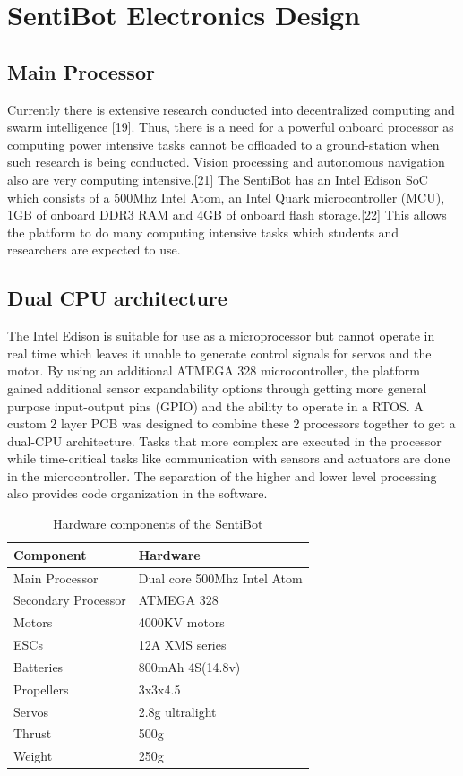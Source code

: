 \documentclass[12pt]{article}
\begin{document}
\section{SentiBot Electronics Design}

\subsection{Main Processor}

Currently there is extensive research conducted into decentralized computing and swarm intelligence [19].  Thus, there is a need for a powerful onboard processor as computing power intensive tasks cannot be offloaded to a ground-station when such research is being conducted. Vision processing and autonomous navigation also are very computing intensive.[21] The SentiBot has an Intel Edison SoC which consists of a 500Mhz Intel Atom, an Intel Quark microcontroller (MCU), 1GB of onboard DDR3 RAM and 4GB of onboard flash storage.[22] This allows the platform to do many computing intensive tasks which students and researchers are expected to use.

\subsection{Dual CPU architecture}

The Intel Edison is suitable for use as a microprocessor but cannot operate in real time which leaves it unable to generate control signals for servos and the motor. By using an additional ATMEGA 328 microcontroller, the platform gained additional sensor expandability options through getting more general purpose input-output pins (GPIO) and the ability to operate in a RTOS. A custom 2 layer PCB was designed to combine these 2 processors together to get a dual-CPU architecture. Tasks that more complex are executed in the processor while time-critical tasks like communication with sensors and actuators are done in the microcontroller. The separation of the higher and lower level processing also provides code organization in the software.

\begin{table}
	\begin{tabular}{ | l | l | }
		Component & Hardware \\
		\hline
		Main Processor & Dual core 500Mhz Intel Atom \\
		Secondary Processor & ATMEGA 328 \\
		Motors & 4000KV motors \\
		ESCs & 12A XMS series \\
		Batteries & 800mAh 4S(14.8v) \\
		Propellers & 3x3x4.5 \\
		Servos & 2.8g ultralight \\
		Thrust & 500g \\
		Weight & 250g \\
	\end{tabular}
	\caption{Hardware components of the SentiBot}
	\label{fig:sb-components}
\end{table}
\end{document}
